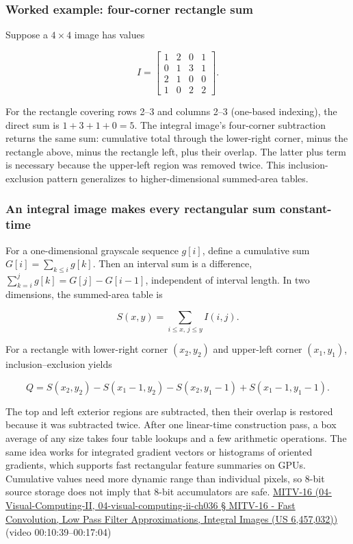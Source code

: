 \subsubsection{Worked example: four-corner rectangle sum}\label{worked-example-four-corner-rectangle-sum}

Suppose a \(4\times4\) image has values

\[
I=\begin{bmatrix}1&2&0&1\\0&1&3&1\\2&1&0&0\\1&0&2&2\end{bmatrix}.
\]

For the rectangle covering rows 2--3 and columns 2--3 (one-based indexing), the direct sum is \(1+3+1+0=5\). The integral image's four-corner subtraction returns the same sum: cumulative total through the lower-right corner, minus the rectangle above, minus the rectangle left, plus their overlap. The latter plus term is necessary because the upper-left region was removed twice. This inclusion-exclusion pattern generalizes to higher-dimensional summed-area tables.

\subsubsection{An integral image makes every rectangular sum constant-time}\label{an-integral-image-makes-every-rectangular-sum-constant-time}

For a one-dimensional grayscale sequence \(g[i]\), define a cumulative sum \(G[i]=\sum_{k\le i}g[k]\). Then an interval sum is a difference, \(\sum_{k=i}^{j}g[k]=G[j]-G[i-1]\), independent of interval length. In two dimensions, the summed-area table is

\[
S(x,y)=\sum_{i\le x,\,j\le y}I(i,j).
\]

For a rectangle with lower-right corner \((x_2,y_2)\) and upper-left corner \((x_1,y_1)\), inclusion--exclusion yields

\[
Q=S(x_2,y_2)-S(x_1-1,y_2)-S(x_2,y_1-1)+S(x_1-1,y_1-1).
\]

The top and left exterior regions are subtracted, then their overlap is restored because it was subtracted twice. After one linear-time construction pass, a box average of any size takes four table lookups and a few arithmetic operations. The same idea works for integrated gradient vectors or histograms of oriented gradients, which supports fast rectangular feature summaries on GPUs. Cumulative values need more dynamic range than individual pixels, so 8-bit source storage does not imply that 8-bit accumulators are safe. \href{}{MITV-16 (04-Visual-Computing-II, 04-visual-computing-ii-ch036 § MITV-16 - Fast Convolution, Low Pass Filter Approximations, Integral Images (US 6,457,032))} (video 00:10:39--00:17:04)

